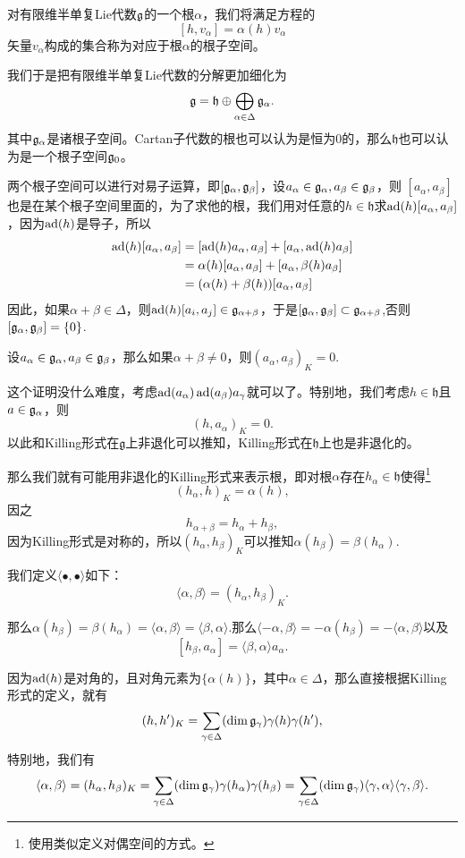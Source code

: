 \para 对有限维半单复Lie代数${\mathfrak{g}}$的一个根$\alpha$，我们将满足方程的
\[
[h,v_\alpha]=\alpha(h)v_\alpha
\]
矢量$v_\alpha$构成的集合称为对应于根$\alpha$的根子空间。

我们于是把有限维半单复Lie代数的分解更加细化为
\[
	{\mathfrak{g}}=\mathfrak{h}\oplus \bigoplus_{\alpha\in\Delta} {\mathfrak{g}}_\alpha.
\]
其中${\mathfrak{g}}_\alpha$是诸根子空间。Cartan子代数的根也可以认为是恒为0的，那么$\mathfrak{h}$也可以认为是一个根子空间${\mathfrak{g}}_0$。

两个根子空间可以进行对易子运算，即$[{\mathfrak{g}}_\alpha,{\mathfrak{g}}_\beta]$，设$a_\alpha\in{\mathfrak{g}}_\alpha,a_\beta\in{\mathfrak{g}}_\beta$，则
$[a_\alpha,a_\beta]$也是在某个根子空间里面的，为了求他的根，我们用对任意的$h\in \mathfrak{h}$求$\operatorname{ad}(h)[a_\alpha,a_\beta]$，因为$\operatorname{ad}(h)$是导子，所以
\[
	\begin{split}
		\operatorname{ad}(h)[a_\alpha,a_\beta]&=[\operatorname{ad}(h)a_\alpha,a_\beta]+[a_\alpha,\operatorname{ad}(h)a_\beta]\\
		&=\alpha(h)[a_\alpha,a_\beta]+[a_\alpha,\beta(h)a_\beta]\\
		&=(\alpha(h)+\beta(h))[a_\alpha,a_\beta]
	\end{split}
\]
因此，如果$\alpha+\beta\in\Delta$，则$\operatorname{ad}(h)[a_i,a_j]\in {\mathfrak{g}}_{\alpha+\beta}$，于是$[{\mathfrak{g}}_\alpha,{\mathfrak{g}}_\beta]\subset {\mathfrak{g}}_{\alpha+\beta}$,否则$[{\mathfrak{g}}_\alpha,{\mathfrak{g}}_\beta]=\{0\}$.

\theo 设$a_\alpha\in{\mathfrak{g}}_\alpha,a_\beta\in{\mathfrak{g}}_\beta$，那么如果$\alpha+\beta\neq 0$，则$(a_\alpha,a_\beta)_K=0$.

这个证明没什么难度，考虑$\operatorname{ad}(a_\alpha) \operatorname{ad}(a_\beta) a_\gamma$就可以了。特别地，我们考虑$h\in \mathfrak{h}$且$a\in {\mathfrak{g}}_\alpha$，则
\[
	(h,a_\alpha)_K=0.
\]
以此和Killing形式在$\mathfrak{g}$上非退化可以推知，Killing形式在$\mathfrak{h}$上也是非退化的。

那么我们就有可能用非退化的Killing形式来表示根，即对根$\alpha$存在$h_\alpha\in\mathfrak{h}$使得\footnote{使用类似定义对偶空间的方式。}
\[
	(h_\alpha,h)_K=\alpha(h),
\]
因之
\[
	h_{\alpha+\beta}=h_\alpha+h_\beta,
\]
因为Killing形式是对称的，所以$(h_\alpha,h_\beta)_K$可以推知$\alpha(h_\beta)=\beta(h_\alpha)$.

\para 我们定义$\langle \bullet,\bullet \rangle$如下：
\[
	\langle \alpha,\beta \rangle=(h_\alpha,h_\beta)_K.
\]

那么$\alpha(h_\beta)=\beta(h_\alpha)=\langle \alpha,\beta \rangle=\langle \beta,\alpha \rangle$.那么$\langle -\alpha,\beta \rangle=-\alpha(h_\beta)=-\langle \alpha,\beta \rangle$以及
\[
	[h_\beta,a_\alpha]=\langle \beta,\alpha \rangle a_\alpha.
\]

因为$\operatorname{ad}(h)$是对角的，且对角元素为$\{\alpha(h)\}$，其中$\alpha\in\Delta$，那么直接根据Killing形式的定义，就有
\[
	(h,h')_K=\sum_{\gamma \in \Delta}(\dim {\mathfrak{g}}_\gamma)\gamma(h)\gamma(h'),
\]
特别地，我们有
\[
	\langle \alpha,\beta \rangle=(h_\alpha,h_\beta)_K=\sum_{\gamma \in \Delta}(\dim {\mathfrak{g}}_\gamma)\gamma(h_\alpha)\gamma(h_\beta)=\sum_{\gamma \in \Delta}(\dim {\mathfrak{g}}_\gamma)\langle \gamma,\alpha\rangle\langle \gamma,\beta\rangle.
\]


